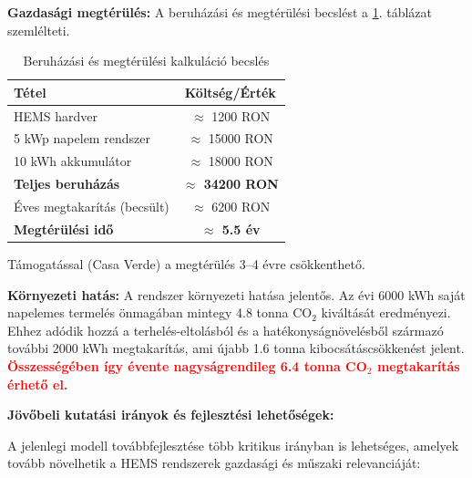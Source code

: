 \textbf{Gazdasági megtérülés:}
A beruházási és megtérülési becslést a \ref{tab:payback_estimate}. táblázat szemlélteti.

\begin{table}[H]
\centering
\caption{Beruházási és megtérülési kalkuláció becslés}
\label{tab:payback_estimate}
\begin{tabular}{lc}
\toprule
\textbf{Tétel} & \textbf{Költség/Érték} \\
\midrule
HEMS hardver & $\approx$ 1200 RON \\
5 kWp napelem rendszer & $\approx$ 15000 RON \\
10 kWh akkumulátor & $\approx$ 18000 RON \\
\midrule
\textbf{Teljes beruházás} & \textbf{$\approx$ 34200 RON} \\
\midrule
Éves megtakarítás (becsült) & $\approx$ 6200 RON \\
\midrule
\rowcolor{yellow!30}
\textbf{Megtérülési idő} & \textbf{$\approx$ 5.5 év} \\
\bottomrule
\end{tabular}
\end{table}
Támogatással (Casa Verde) a megtérülés 3--4 évre csökkenthető.

\textbf{Környezeti hatás:}
A rendszer környezeti hatása jelentős. Az évi 6000 kWh saját napelemes termelés önmagában mintegy 4.8 tonna CO$_2$ kiváltását eredményezi. Ehhez adódik hozzá a terhelés-eltolásból és a hatékonyságnövelésből származó további 2000 kWh megtakarítás, ami újabb 1.6 tonna kibocsátáscsökkenést jelent. \textcolor{red}{\textbf{Összességében így évente nagyságrendileg 6.4 tonna CO$_2$ megtakarítás érhető el.}}

\textbf{Jövőbeli kutatási irányok és fejlesztési lehetőségek:}

A jelenlegi modell továbbfejlesztése több kritikus irányban is lehetséges, amelyek tovább növelhetik a HEMS rendszerek gazdasági és műszaki relevanciáját:

